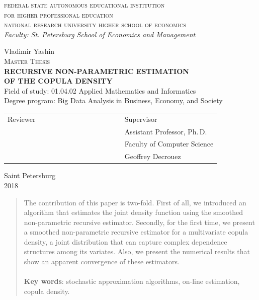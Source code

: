 \documentclass[12pt]{article}
\begin{document}
	\thispagestyle{empty}
	\newpage
	\begin{center}
		\textsc{
			federal state autonomous educational institution \\ 
			for higher professional education \\
			national research university higher school of economics \\
		}
		\textit{Faculty: St. Petersburg School of Economics and Management}
		\vspace*{\fill}
		
		Vladimir Yashin \\[1em]
		\textsc{Master Thesis} \\[1em]
		\textbf{RECURSIVE NON-PARAMETRIC ESTIMATION \\OF THE COPULA DENSITY} \\[1em]
		Field of study: 01.04.02 Applied Mathematics and Informatics\\[1em]
		Degree program: Big Data Analysis in Business, Economy, and Society
		
		\vspace*{\fill}
		
		\begin{tabular} {p{0.55\linewidth} p{0.55\linewidth}}
			Reviewer  & Supervisor \\[0.5em]
			\makebox[15em]{\hrulefill} & Assistant Professor, Ph.\,D.\\[0.5em]
			\makebox[15em]{\hrulefill} & Faculty of Computer Science \\[0.5em]
			\makebox[15em]{\hrulefill} & Geoffrey Decrouez \\[0.5em]
		\end{tabular}
		
		\vspace*{\fill}
		Saint Petersburg \\
		2018
	\end{center}
	\clearpage
	\newpage
	\noindent
	
	\begin{abstract}
		The contribution of this paper is two-fold. First of all, we introduced an algorithm that estimates the joint density function using the smoothed non-parametric recursive estimator. Secondly, for the first time, we present a smoothed non-parametric recursive estimator for a multivariate copula density, a joint distribution that can capture complex dependence structures among its variates. Also, we present the numerical results that show an apparent convergence of these estimators.\\
		\\
		\textbf{Key words}: stochastic approximation algorithms, on-line estimation, copula density.
	\end{abstract}
	
\end{document}
